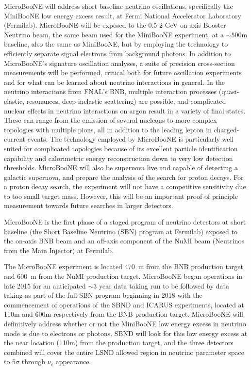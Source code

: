 MicroBooNE will address short baseline neutrino oscillations, specifically the MiniBooNE low energy excess result, at Fermi National Accelerator Laboratory (Fermilab).  MicroBooNE will be exposed to the  0.5-2 GeV on-axis Booster Neutrino beam, the same beam used for the MiniBooNE experiment, at a $\sim 500$m baseline, also the same as MiniBooNE, but by employing the \lartpc technology to efficiently separate signal electrons from background photons.  In addition to MicroBooNE's signature oscillation analyses, a suite of precision cross-section measurements will be performed, critical both for future \lartpc oscillation experiments and for what can be learned about neutrino interactions in general.   In the neutrino interactions from FNAL's BNB, multiple interaction processes (quasi-elastic, resonances, deep inelastic scattering) are possible, and complicated nuclear effects in neutrino interactions on argon result in a variety of final states. These can range from the emission of several nucleons to more complex topologies with multiple pions, all in addition to the leading lepton in charged-current events. The \lartpc technology employed by MicroBooNE is particularly well suited for complicated topologies because of its excellent particle identification capability and calorimetric energy reconstruction down to very low detection thresholds. MicroBooNE will also be supernova live and capable of detecting a galactic supernova, and prepare the analysis of  the search for proton decays. For a proton decay search, the experiment will not have a competitive sensitivity due to too small target mass. However, this will be an important proof of principle measurement towards future searches in larger detectors.  

MicroBooNE is the first phase of a staged program of neutrino detectors at short baseline (the Short Baseline Neutrino (SBN) program at Fermilab) exposed to the on-axis BNB beam and an off-axis component of the NuMI beam (Neutrinos from the Main Injector) at Fermilab.  

The MicroBooNE experiment is located 470~m from the BNB production target and 600~m from the NuMI production target.  MicroBooNE began operations in late 2015 for an anticipated $\sim$3 year data taking run to be followed by data taking as part of the full SBN program beginning in 2018 with the commencement of operations of the SBND \cite{send} and ICARUS experiments, located at 110m and 600m respectively from the BNB production target.  MicroBooNE will definitively address whether or not the MiniBooNE low energy excess in neutrino mode is due to electrons or photons.  SBND will look for this low energy excess at the near location (110m) from the production target, and the three detectors combined will cover the entire LSND allowed region in neutrino parameter space to 5$\sigma$ through $\nu_e$ appearance.

